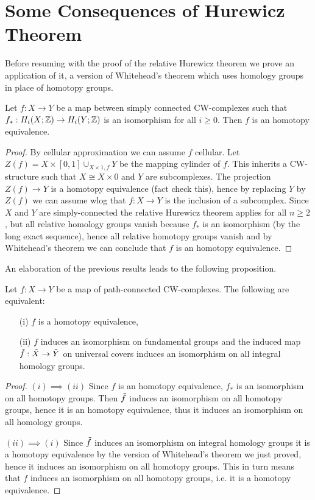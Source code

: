 
\section{Some Consequences of Hurewicz Theorem}


Before resuming with the proof of the relative Hurewicz theorem we prove an application of it, a version of Whitehead's theorem which uses homology groups in place of homotopy groups.

\begin{theorem}
Let $f:X\to Y$ be a map between simply connected CW-complexes such that $f_*:H_i(X;{\mathbb Z})\to H_i(Y;{\mathbb Z})$ is an isomorphism for all $i\geq 0$. Then $f$ is an homotopy equivalence.
\end{theorem}

\begin{proof}
By cellular approximation we can assume $f$ cellular. Let $Z(f)=X\times[0,1]\cup_{X\times1, f}Y$ be the mapping cylinder of $f$. This inherits a CW-structure such that $X\cong X\times0$ and $Y$ are subcomplexes. The projection $Z(f)\to Y$ is a homotopy equivalence (fact check this), hence by replacing $Y$ by $Z(f)$ we can assume wlog that $f:X\to Y$ is the inclusion of a subcomplex. Since $X$ and $Y$ are simply-connected the relative Hurewicz theorem applies for all $n\geq2$, but all relative homology groups vanish because $f_*$ is an isomorphism (by the long exact sequence), hence all relative homotopy groups vanish and by Whitehead's theorem we can conclude that $f$ is an homotopy equivalence.
\end{proof}

An elaboration of the previous results leads to the following proposition.

\begin{proposition}
Let $f:X\to Y$ be a map of path-connected CW-complexes. The following are equivalent:
\begin{itemize}
    \item[(i)] $f$ is a homotopy equivalence,
    \item[(ii)] $f$ induces an isomorphism on fundamental groups and the induced map $\tilde{f}:\tilde{X}\to\tilde{Y}$ on universal covers induces an isomorphism on all integral homology groups.
\end{itemize}
\end{proposition}

\begin{proof}
$(i)\implies(ii)$ Since $f$ is an homotopy equivalence, $f_*$ is an isomorphism on all homotopy groups. Then $\tilde{f}$ induces an isomorphism on all homotopy groups, hence it is an homotopy equivalence, thus it induces an isomorphism on all homology groups.

$(ii)\implies(i)$ Since $\tilde{f}$ induces an isomorphism on integral homology groups it is a homotopy equivalence by the version of Whitehead's theorem we just proved, hence it induces an isomorphism on all homotopy groups. This in turn means that $f$ induces an isomorphism on all homotopy groups, i.e. it is a homotopy equivalence.
\end{proof}

